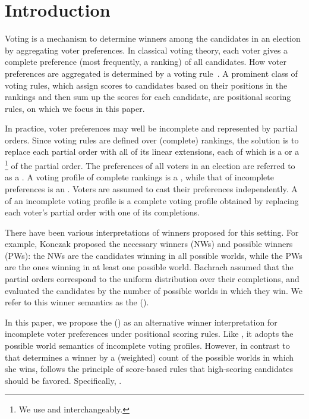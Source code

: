 \section{Introduction}
\label{sec:intro}

Voting is a mechanism to determine winners among the candidates in an election by aggregating voter preferences. In classical voting theory, each voter gives a complete preference (most frequently, a ranking) of all candidates.   How voter preferences are aggregated is determined by a voting rule~\cite{DBLP:journals/scw/PritchardW07,DBLP:conf/aaai/GoldsmithLMP14,DBLP:journals/jasss/Seidl18}.
A prominent class of voting rules, which assign scores to candidates based on their positions in the rankings and then sum up the scores for each candidate, are positional scoring rules, on which we focus in this paper.


In practice, voter preferences may well be incomplete and represented by partial orders.
Since voting rules are defined over (complete) rankings, the solution is to replace each partial order with all of its linear extensions, each of which is a  or a \footnote{We use  and  interchangeably.} of the partial order.
The preferences of all voters in an election are referred to as a .
A voting profile of complete rankings is a , while that of incomplete preferences is an .
Voters are assumed to cast their preferences independently.
A  of an incomplete voting profile is a complete voting profile obtained by replacing each voter's partial order with one of its completions.

There have been various interpretations of winners proposed for this setting.
For example, Konczak \etal \cite{konczak2005voting} proposed the necessary winners (NWs) and possible winners (PWs): the
NWs are the candidates winning in all possible worlds, while the PWs are the ones winning in at least one possible world. Bachrach \etal \cite{DBLP:conf/aaai/BachrachBF10} assumed that the partial orders correspond to the uniform distribution over their completions, and evaluated the candidates by the number of possible worlds in which they win. We refer to this winner semantics as the \e{\mPw} (\mpw).

In this paper, we propose the \e{\mEw} (\mew) as an alternative winner interpretation for incomplete voter preferences under positional scoring rules. Like \mpw, it adopts the  possible world semantics of incomplete voting profiles.  However, in contrast to \mpw that determines a winner by a (weighted) count of the possible worlds in which she wins, \mew follows the principle of score-based rules that high-scoring candidates should be favored.  Specifically, .

